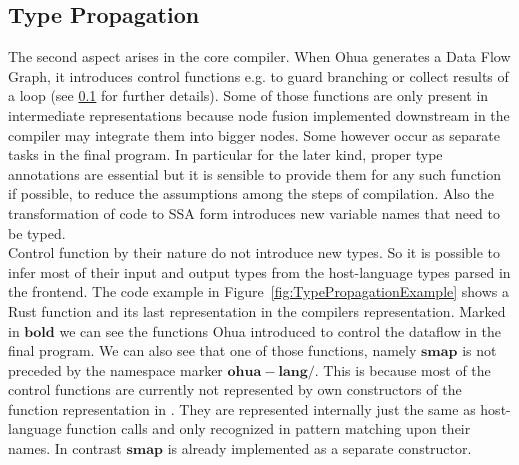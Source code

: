 \subsection{Type Propagation}
The second aspect arises in the core compiler. When Ohua generates a Data Flow Graph, it introduces control functions e.g. to guard branching or collect results of a loop (see \ref{} for further details). Some of those functions are only present in intermediate representations because node fusion implemented downstream in the compiler may integrate them into bigger nodes. Some however occur as separate tasks in the final program. In particular for the later kind, proper type annotations are essential but it is sensible to provide them for any such function if possible, to reduce the assumptions among the steps of compilation. Also the transformation of code to SSA form introduces new variable names that need to be typed.\\

Control function by their nature do not introduce new types. So it is possible to infer most of their input and output types from the host-language types parsed in the frontend. The code example in Figure~\ref{fig:TypePropagationExample} shows a Rust function and its last representation in the compilers  representation. Marked in $\mathbf{bold}$ we can see the functions Ohua introduced to control the dataflow in the final program. We can also see that one of those functions, namely $\mathbf{smap}$ is not preceded by the namespace marker $\mathbf{ohua-lang/}$. This is because most of the control functions are currently not represented by own constructors of the function representation in . They are represented internally just the same as host-language function calls and only recognized in pattern matching upon their names. In contrast $\mathbf{smap}$ is already implemented as a separate constructor. 

